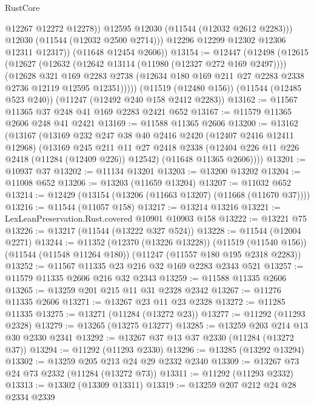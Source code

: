 \begin{lexlean}{RustCore}
\begin{coremodule}
                  @12267
                  @12272
                  @12278))
              @12595
              @12030
              (@11544 (@12032 @2612 @2283)))
            @12030
            (@11544 (@12032 @2500 @2714)))
          @12296
          @12299
          @12302
          @12306
          @12311
          @12317))
      (@11648 @12454 @2606))
@13154 := @12447
    (@12498
      (@12615
        (@12627
          (@12632 (@12642 @13114 (@11980 (@12327 @272 @169 @2497))))
          (@12628
            @321
            @169
            @2283
            @2738
            (@12634 @180 @169 @211 @27 @2283 @2338 @2736 @12119 @12595 @12351)))))
    (@11519 (@12480 @156))
    (@11544 (@12485 @523 @240))
    (@11247 (@12492 @240 @158 @2412 @2283))
@13162 := @11567 @11365 @37 @248 @41 @169 @2283 @2421 @652
@13167 := @11579 @11365 @2606 @248 @41 @2421
@13169 := @11588 @11365 @2606
@13200 := @13162
    (@13167
      (@13169
        @232
        @247
        @38
        @40
        @2416
        @2420
        (@12407 @2416 @12411 @12968)
        (@13169
          @245
          @211
          @11
          @27
          @2418
          @2338
          (@12404 @226 @11 @226 @2418 (@11284 (@12409 @226)) @12542)
          (@11648 @11365 @2606))))
@13201 := @10937 @37
@13202 := @11134 @13201
@13203 := @13200 @13202
@13204 := @11008 @652
@13206 := @13203 (@11659 @13204)
@13207 := @11032 @652
@13214 := @12429 (@13154 (@13206 (@11663 @13207) (@11668 (@11670 @37))))
@13216 := @11544 (@11057 @158)
@13217 := @13214 @13216
@13221 := LexLeanPreservation.Rust.covered @10901 @10903 @158
@13222 := @13221 @75
@13226 := @13217 (@11544 (@13222 @327 @524))
@13228 := @11544 (@12004 @2271)
@13244 := @11352
    (@12370 (@13226 @13228))
    (@11519 (@11540 @156))
    (@11544 (@11548 @11264 @180))
    (@11247 (@11557 @180 @195 @2318 @2283))
@13252 := @11567 @11335 @23 @216 @32 @169 @2283 @2343 @521
@13257 := @11579 @11335 @2606 @216 @32 @2343
@13259 := @11588 @11335 @2606
@13265 := @13259 @201 @215 @11 @31 @2328 @2342
@13267 := @11276 @11335 @2606
@13271 := @13267 @23 @11 @23 @2328
@13272 := @11285 @11335
@13275 := @13271 (@11284 (@13272 @23))
@13277 := @11292 (@11293 @2328)
@13279 := @13265 (@13275 @13277)
@13285 := @13259 @203 @214 @13 @30 @2330 @2341
@13292 := @13267 @37 @13 @37 @2330 (@11284 (@13272 @37))
@13294 := @11292 (@11293 @2330)
@13296 := @13285 (@13292 @13294)
@13302 := @13259 @205 @213 @24 @29 @2332 @2340
@13309 := @13267 @73 @24 @73 @2332 (@11284 (@13272 @73))
@13311 := @11292 (@11293 @2332)
@13313 := @13302 (@13309 @13311)
@13319 := @13259 @207 @212 @24 @28 @2334 @2339

\end{coremodule}
\end{lexlean}
